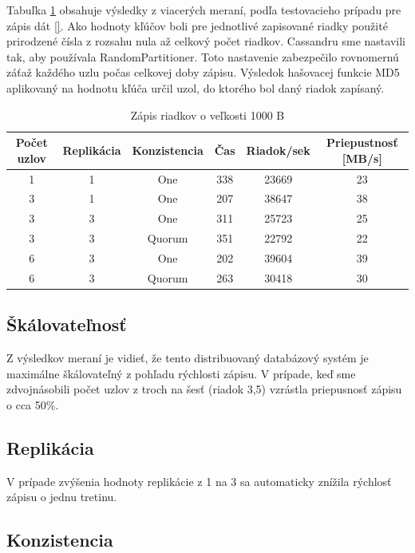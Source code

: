 \documentclass[11pt,twoside,a4paper]{book}
\begin{document}
Tabuľka \ref{tab:CPerf2} obsahuje výsledky z viacerých meraní, podľa testovacieho prípadu pre zápis dát \ref{}. Ako hodnoty kľúčov boli pre jednotlivé zapisované riadky použité prirodzené čísla z rozsahu nula až celkový počet riadkov. Cassandru sme nastavili tak, aby používala RandomPartitioner. Toto nastavenie zabezpečilo rovnomernú záťaž každého uzlu počas celkovej doby zápisu. Výsledok hašovacej funkcie MD5 aplikovaný na hodnotu kľúča určil uzol, do ktorého bol daný riadok zapísaný.

\begin{table}[hp]
\begin{center}
\begin{tabular}{|c|c|c|c|c|c|}
\hline Počet uzlov & Replikácia & Konzistencia & Čas & Riadok/sek & Priepustnosť [MB/s]\\ 
\hline
\hline 1 & 1 & One & 338 & 23669 & 23\\ 
\hline 3 & 1 & One & 207 & 38647 & 38\\ 
\hline 3 & 3 & One & 311 & 25723 & 25\\ 
\hline 3 & 3 & Quorum & 351 & 22792 & 22\\ 
\hline 6 & 3 & One & 202 & 39604 & 39\\ 
\hline 6 & 3 & Quorum & 263 & 30418 & 30\\ 
\hline
\end{tabular} 
\end{center}
\caption{Zápis riadkov o veľkosti 1000 B}
\label{tab:CPerf2}
\end{table}

\subsection*{Škálovateľnosť}

Z výsledkov meraní je vidieť, že tento distribuovaný databázový systém je maximálne škálovateľný z pohľadu rýchlosti zápisu. V prípade, keď sme zdvojnásobili počet uzlov z troch na šesť (riadok 3,5) vzrástla priepusnosť zápisu o cca 50\%.

\subsection*{Replikácia}

V prípade zvýšenia hodnoty replikácie z 1 na 3 sa automaticky znížila rýchlosť zápisu o jednu tretinu.

\subsection*{Konzistencia}
\end{document}
